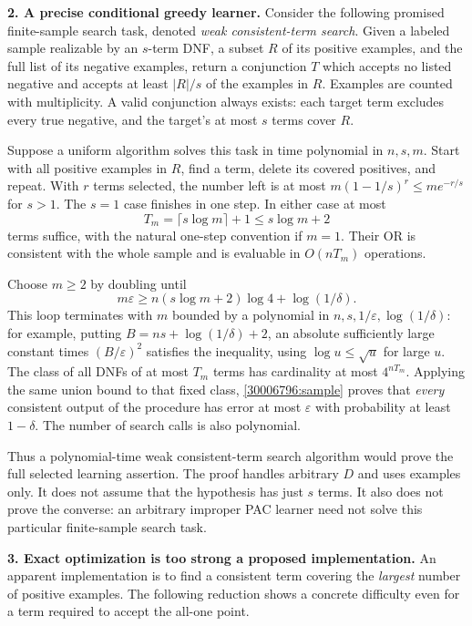 \documentclass[11pt,a4paper]{article}
\newcommand{\eps}{\varepsilon}
\numberwithin{equation}{section}
\begin{document}
\textbf{2. A precise conditional greedy learner.}
Consider the following promised finite-sample search task, denoted
\emph{weak consistent-term search}. Given a labeled sample realizable by
an $s$-term DNF, a subset $R$ of its positive examples, and the full list
of its negative examples, return a conjunction $T$ which accepts no
listed negative and accepts at least $|R|/s$ of the examples in $R$.
Examples are counted with multiplicity. A valid conjunction always
exists: each target term excludes every true negative, and the target's
at most $s$ terms cover $R$.

Suppose a uniform algorithm solves this task in time polynomial in
$n,s,m$. Start with all positive examples in $R$, find a term, delete
its covered positives, and repeat. With $r$ terms selected, the number
left is at most $m(1-1/s)^r\le me^{-r/s}$ for $s>1$.
The $s=1$ case finishes in one step. In either case at most
\[
 T_m=\lceil s\log m\rceil+1\le s\log m+2
\]
terms suffice, with the natural one-step convention if $m=1$.
Their OR is consistent with the whole sample and is evaluable in
$O(nT_m)$ operations.

Choose $m\ge2$ by doubling until
\begin{equation}\label{30006796:sample}
 m\eps\ge n(s\log m+2)\log4+\log(1/\delta).
\end{equation}
This loop terminates with $m$ bounded by a polynomial in
$n,s,1/\eps,\log(1/\delta)$: for example, putting
$B=ns+\log(1/\delta)+2$, an absolute sufficiently large constant times
$(B/\eps)^2$ satisfies the inequality, using $\log u\le\sqrt u$ for
large $u$. The class of all DNFs of at most $T_m$ terms has cardinality
at most $4^{nT_m}$. Applying the same union bound to that fixed class,
\eqref{30006796:sample} proves that \emph{every} consistent output of the
procedure has error at most $\eps$ with probability at least $1-\delta$.
The number of search calls is also polynomial.

Thus a polynomial-time weak consistent-term search algorithm would prove
the full selected learning assertion. The proof handles arbitrary $D$
and uses examples only. It does not assume that the hypothesis has just
$s$ terms. It also does not prove the converse: an arbitrary improper
PAC learner need not solve this particular finite-sample search task.

\textbf{3. Exact optimization is too strong a proposed implementation.}
An apparent implementation is to find a consistent term covering the
\emph{largest} number of positive examples. The following reduction
shows a concrete difficulty even for a term required to accept the
all-one point.
\end{document}
